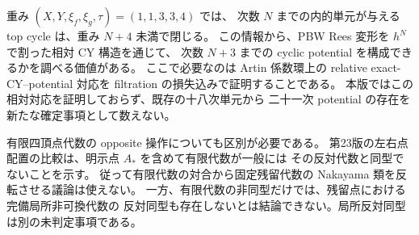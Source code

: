 重み $(X,Y,\xi_f,\xi_g,\tau)=(1,1,3,3,4)$ では、
次数 $N$ までの内的単元が与える top cycle は、重み $N+4$ 未満で閉じる。
この情報から、PBW Rees 変形を $h^N$ で割った相対 CY 構造を通じて、
次数 $N+3$ までの cyclic potential を構成できるかを調べる価値がある。
ここで必要なのは Artin 係数環上の relative exact-CY--potential 対応を
filtration の損失込みで証明することである。
本版ではこの相対対応を証明しておらず、既存の十八次単元から
二十一次 potential の存在を新たな確定事項として数えない。

有限四頂点代数の opposite 操作についても区別が必要である。
第23版の左右点配置の比較は、明示点 $A_*$ を含めて有限代数が一般には
その反対代数と同型でないことを示す。
従って有限代数の対合から固定残留代数の Nakayama 類を反転させる議論は使えない。
一方、有限代数の非同型だけでは、残留点における完備局所非可換代数の
反対同型も存在しないとは結論できない。局所反対同型は別の未判定事項である。
